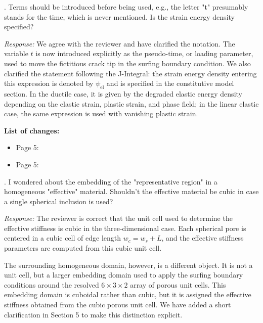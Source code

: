 \documentclass[pdflatex,sn-mathphys-num]{sn-jnl}
\begin{document}
\bigskip

. Terms should be introduced before being used, e.g., the letter "t" presumably stands for the time, which is never mentioned. Is the strain energy density specified?

\emph{Response:} We agree with the reviewer and have clarified the notation. The variable $t$ is now introduced explicitly as the pseudo-time, or loading parameter, used to move the fictitious crack tip in the surfing boundary condition. We also clarified the statement following the J-Integral: the strain energy density entering this expression is denoted by $\psi_{\mathrm{el}}$ and is specified in the constitutive model section. In the ductile case, it is given by the degraded elastic energy density depending on the elastic strain, plastic strain, and phase field; in the linear elastic case, the same expression is used with vanishing plastic strain.

\textbf{List of changes:}
\begin{itemize}
\item Page 5: 
\item Page 5:  
\end{itemize}

\bigskip

. I wondered about the embedding of the "representative region" in a homogeneous "effective" material. Shouldn't the effective material be cubic in case a single spherical inclusion is used?

\emph{Response:} The reviewer is correct that the unit cell used to determine the effective stiffness is cubic in the three-dimensional case. Each spherical pore is centered in a cubic cell of edge length $w_c=w_s+L$, and the effective stiffness parameters are computed from this cubic unit cell.

The surrounding homogeneous domain, however, is a different object. It is not a unit cell, but a larger embedding domain used to apply the surfing boundary conditions around the resolved $6\times3\times2$ array of porous unit cells. This embedding domain is cuboidal rather than cubic, but it is assigned the effective stiffness obtained from the cubic porous unit cell. We have added a short clarification in Section 5 to make this distinction explicit.
\end{document}
